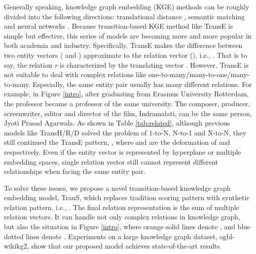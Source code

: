 \documentclass[11pt]{article}
\begin{document}
Generally speaking, knowledge graph embedding (KGE) methods can be roughly divided into the following directions: translational distance \cite{bordes2013translating,wang2014knowledge,fan2014transition,lin2015learning,ji2015knowledge}, semantic matching \cite{10.5555/3104482.3104584,10.5555/3120260.3120289,yang2014embedding,10.5555/3016100.3016172,trouillon2016complex} and neural networks \cite{10.1007/s10994-013-5363-6,DBLP:journals/corr/Liu0LWH16,li2016gated, 10.5555/3305381.3305512, xu2018how}.
Because transition-based KGE method like TransE \cite{bordes2013translating} is simple but effective, this series of models are becoming more and more popular in both academia and industry. Specifically, TransE makes the difference between two entity vectors ( and ) approximate to the relation vector (), i.e., . That is to say, the relation \textit{r} is characterized by the translating vector .
However, TransE is not suitable to deal with complex relations like one-to-many/many-to-one/many-to-many. 
Especially, the same entity pair usually has many different relations. For example, in Figure \ref{intro}, after graduating from Erasmus University Rotterdam, the professor became a professor of the same university.
The composer, producer, screenwriter, editor and director of the film, Indramalati, can be the same person, Jyoti Prasad Agarwala. As shown in Table \ref{tab:related}, although previous models like TransH/R/D \cite{wang2014knowledge,lin2015learning,ji2015knowledge} solved the problem of 1-to-N, N-to-1 and N-to-N, they still continued the TransE pattern, , where  and  are the deformation of   and  respectively. Even if the entity vector is represented by hyperplane or multiple embedding spaces, single relation vector  still cannot represent different relationships when facing the same entity pair.

To solve these issues, we propose a novel transition-based knowledge graph embedding model, TranS, which replaces tradition scoring pattern with synthetic relation pattern, i.e., . The final relation representation is the sum of multiple relation vectors. It can handle not only complex relations in knowledge graph, but also the situation in Figure \ref{intro}, where orange solid lines denote , and  blue dotted lines denote . Experiments on a large knowledge graph dataset, ogbl-wikikg2, show that our proposed model achieves  state-of-the-art results.
\end{document}
